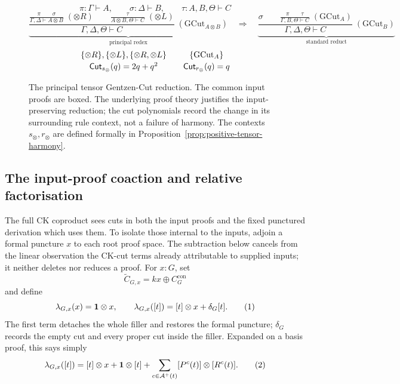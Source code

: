 \documentclass[10pt,a4paper]{article}
\theoremstyle{plain}
\theoremstyle{definition}
\theoremstyle{remark}
\newcommand{\ms}{\mathrel{\vdash}}
\newcommand{\one}{\mathbf 1}
\newcommand{\eqtag}{\refstepcounter{equation}\tag{\theequation}}
\begin{document}
\begin{figure}[H]
\centering
\small
\[
\boxed{\pi}:\Gamma\ms A,\qquad
\boxed{\sigma}:\Delta\ms B,\qquad
\boxed{\tau}:A,B,\Theta\ms C
\]
\[
\underbrace{
\frac{
  \displaystyle
  \frac{\boxed{\pi}\qquad\boxed{\sigma}}
       {\Gamma,\Delta\ms A\otimes B}\;(\otimes R)
  \qquad
  \displaystyle
  \frac{\boxed{\tau}}
       {A\otimes B,\Theta\ms C}\;(\otimes L)
}{
  \Gamma,\Delta,\Theta\ms C
}\;(\mathrm{GCut}_{A\otimes B})
}_{\text{principal redex}}
\quad\Longrightarrow\quad
\underbrace{
\frac{
  \boxed{\sigma}
  \qquad
  \displaystyle
  \frac{\boxed{\pi}\qquad\boxed{\tau}}
       {\Gamma,B,\Theta\ms C}\;(\mathrm{GCut}_A)
}{
  \Gamma,\Delta,\Theta\ms C
}\;(\mathrm{GCut}_B)
}_{\text{standard reduct}}
\]
\[
\begin{array}{c@{\qquad}c}
\{\otimes R\},\{\otimes L\},\{\otimes R,\otimes L\}
&
\{\mathrm{GCut}_A\}
\\[2pt]
\mathsf{Cut}_{s_\otimes}(q)=2q+q^2
&
\mathsf{Cut}_{r_\otimes}(q)=q
\end{array}
\]
\caption{The principal tensor Gentzen-Cut reduction.  The common input
proofs are boxed.  The underlying proof theory justifies the
input-preserving reduction; the cut polynomials record the change in its
surrounding rule context, not a failure of harmony.  The contexts
\(s_\otimes,r_\otimes\) are defined formally in
Proposition~\ref{prop:positive-tensor-harmony}.}
\label{fig:tensor-cut-inputs}
\end{figure}

\subsection{The input-proof coaction and relative factorisation}

The full CK coproduct sees cuts in both the input proofs and the fixed
punctured derivation which uses them.  To isolate those internal to the
inputs, adjoin a formal puncture \(x\) to each root proof space.  The
subtraction below cancels from the linear observation the CK-cut terms
already attributable to supplied inputs; it neither deletes nor reduces a
proof.  For
\(x:G\), set
\[
 \widetilde C_{G,x}=kx\oplus C_G^{\mathrm{con}}
\]
and define
\[
\lambda_{G,x}(x)=\one\otimes x,\qquad
\lambda_{G,x}([t])=[t]\otimes x+\delta_G[t].
\eqtag\label{eq:pointed-coaction}
\]
The first term detaches the whole filler and restores the formal puncture;
\(\delta_G\) records the empty cut and every proper cut inside the filler.
Expanded on a basis proof, this says simply
\[
 \lambda_{G,x}([t])
   =[t]\otimes x+\one\otimes[t]
     +\sum_{c\in\mathcal A^+(t)}
        [P^c(t)]\otimes[R^c(t)].
\eqtag\label{eq:pointed-coaction-expanded}
\]
\end{document}
